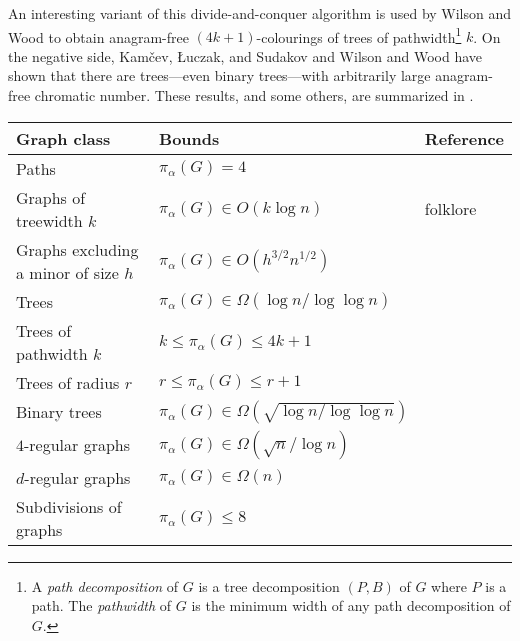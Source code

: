 \documentclass{llncs}
\begin{document}
An interesting variant
of this divide-and-conquer algorithm is used by Wilson and Wood
\cite{wilson.wood:anagram-free} to obtain anagram-free $(4k+1)$-colourings
of trees of pathwidth\footnote{A \emph{path decomposition} of $G$ is a tree decomposition $(P,B)$ of $G$ where $P$ is a path.  The \emph{pathwidth} of $G$ is the minimum width of any path decomposition of $G$.}
 $k$.  On the negative side, Kamčev, Łuczak,
and Sudakov \cite{kamcev.luczak.ea:anagram-free} and Wilson and Wood
\cite{wilson.wood:anagram-free} have shown that there are trees---even
binary trees---with arbitrarily large anagram-free chromatic number.
These results, and some others, are summarized in .

\begin{table}
  \begin{center}
    \begin{tabular}{lll}
      \textbf{Graph class} & \textbf{Bounds} & \textbf{Reference} \\ \hline
       Paths & $\pi_\alpha(G)= 4$ & \cite[Theorem~1]{keranen:abelian}  \\
       Graphs of treewidth $k$ & $\pi_\alpha(G)\in O(k\log n)$ & folklore  \\
       Graphs excluding a minor of size $h$ & $\pi_\alpha(G)\in O(h^{3/2}n^{1/2})$ 
              & \cite[Proposition~1.2]{kamcev.luczak.ea:anagram-free} \\
       Trees & $\pi_\alpha(G)\in\Omega(\log n/\log\log n)$ 
              & \cite[Theorem~3]{wilson.wood:anagram-free} \\
       Trees of pathwidth $k$ & $k\le \pi_\alpha(G)\le 4k+1$ 
              & \cite[Theorem~5]{wilson.wood:anagram-free} \\
       Trees of radius $r$ & $r\le \pi_\alpha(G)\le r+1$ 
              & \cite[Theorem~4]{wilson.wood:anagram-free} \\
       Binary trees & $\pi_\alpha(G)\in\Omega(\sqrt{\log n/\log\log n})$ 
              & \cite[Proposition~1.1]{kamcev.luczak.ea:anagram-free} \\ 
       $4$-regular graphs & $\pi_\alpha(G)\in \Omega(\sqrt{n}/\log n)$ 
           & \cite[Proposition~3.1]{kamcev.luczak.ea:anagram-free} \\
       $d$-regular graphs & $\pi_\alpha(G)\in \Omega(n)$ & \cite[Theorem~1.3]{kamcev.luczak.ea:anagram-free} \\
       Subdivisions of graphs & $\pi_\alpha(G) \le 8$ 
         & \cite[Theorem~6]{wilson.wood:anagram-free2} \\

\end{tabular}
\end{center}
\end{table}
\end{document}
